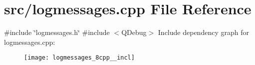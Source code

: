 \section{src/logmessages.cpp File Reference}
\label{logmessages_8cpp}
{\ttfamily \#include \char`\"{}logmessages.\+h\char`\"{}}\newline
{\ttfamily \#include $<$Q\+Debug$>$}\newline
Include dependency graph for logmessages.\+cpp\+:\nopagebreak
\begin{figure}[H]
\begin{center}
\leavevmode
\texttt{[image: logmessages\_8cpp\_\_incl]}
\end{center}
\end{figure}

